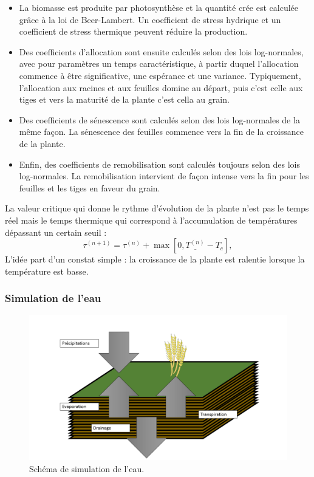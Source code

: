 \begin{itemize}

\item La biomasse est produite par photosynthèse et la quantité crée est calculée grâce à la loi de Beer-Lambert.  Un coefficient de stress hydrique et un coefficient de stress thermique peuvent réduire la production.

\item Des coefficients d'allocation sont ensuite calculés selon des lois log-normales, avec pour paramètres un temps caractéristique, à partir duquel l'allocation commence à être significative, une espérance et une variance. Typiquement, l'allocation aux racines et aux feuilles domine au départ, puis c'est celle aux tiges et vers la maturité de la plante c'est cella au grain.

\item Des coefficients de sénescence sont calculés selon des lois log-normales de la même façon. La sénescence des feuilles commence vers la fin de la croissance de la plante.

\item Enfin, des coefficients de remobilisation sont calculés toujours selon des lois log-normales. La remobilisation intervient de façon intense vers la fin pour les feuilles et les tiges en faveur du grain.

\end{itemize}

La valeur critique qui donne le rythme d'évolution de la plante n'est pas le temps réel mais le temps thermique qui correspond à l'accumulation de températures dépassant un certain seuil :
\[
\tau^{(n+1)} = \tau^{(n)} + \max[0, \underline{T^{(n)}} - T_c], 
\]
L'idée part d'un constat simple : la croissance de la plante est ralentie lorsque la température est basse.

\subsubsection{Simulation de l'eau}

\begin{figure}[H]

\begin{center}
 \includegraphics[scale = 0.42]{./img/waterSchema.png}
 \caption{Schéma de simulation de l'eau.}
 \label{fig:waterModel}
\end{center}

\end{figure}

